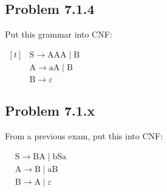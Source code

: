\documentclass[12pt]{scrbook}
\begin{document}
\subsection*{Problem 7.1.4}Put this grammar into CNF:

$\begin{aligned}[t]
& \mathrm{S} \rightarrow \mathrm{AAA} \mid \mathrm{B} \\
& \mathrm{A} \rightarrow \mathrm{aA} \mid \mathrm{B} \\
& \mathrm{B} \rightarrow \varepsilon
\end{aligned}$

\subsection*{Problem 7.1.x}From a previous exam, put this into CNF:

$\begin{aligned}
& \mathrm{S} \rightarrow \mathrm{BA} \mid \mathrm{bSa} \\
& \mathrm{A} \rightarrow \mathrm{B} \mid \mathrm{aB} \\
& \mathrm{B} \rightarrow \mathrm{A} \mid \varepsilon
\end{aligned}$
\end{document}
